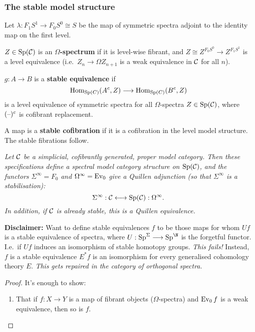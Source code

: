 \begin{MichaelStableModelCats}
\subsubsection*{The stable model structure}
\begin{itemise}
\item Let $\lambda:F_1S^1\to F_0S^0\cong S$ be the map of symmetric spectra adjoint to the identity map on the first level.
\item $Z\in\operatorname{Sp}(\mathcal{C})$ is an \textbf{$\Omega$-spectrum} if it is level-wise fibrant, and $Z\cong Z^{F_0S^0}\to Z^{F_1S^1}$ is a level equivalence (i.e.\ $Z_n\to\Omega Z_{n+1}$ is a weak equivalence in $\mathcal{C}$ for all $n$).
\item $g:A\to B$ is a \textbf{stable equivalence} if
\[\operatorname{Hom}_{\operatorname{Sp}(C)}(A^c,Z)\longrightarrow\operatorname{Hom}_{\operatorname{Sp}(C)}(B^c,Z)\]
is a level equivalence of symmetric spectra for all $\Omega$-spectra $Z\in\operatorname{Sp}(\mathcal{C})$, where $(\textup{--})^c$ is cofibrant replacement.
\item A map is a \textbf{stable cofibration} if it is a cofibration in the level model structure. The stable fibrations follow.
\item \textit{Let $\mathcal{C}$ be a simplicial, cofibrantly generated, proper model category.
Then these specifications define a spectral model category structure on $\operatorname{Sp}(\mathcal{C})$, and the functors $\Sigma^{\infty}=F_0$ and $\Omega^\infty=\operatorname{Ev}_0$ give a Quillen adjunction (so that $\Sigma^\infty$ is a stabilisation):
\[\Sigma^\infty:\mathcal{C}\longleftrightarrow\operatorname{Sp}(\mathcal{C}):\Omega^\infty.\]
In addition, if $\mathcal{C}$ is already stable, this is a Quillen equivalence.}
\item \textbf{Disclaimer:} Want to define stable equivalences $f$ to be those maps for whom $Uf$ is a stable equivalence of spectra, where $U:\Sp^\Sigma\to\Sp^\N$ is the forgetful functor. I.e.\ if $Uf$ induces an isomorphism of stable homotopy groups. \emph{This fails!} Instead, $f$ is a stable equivalence \Iff $E^*f$ is an isomorphism for every generalised cohomology theory $E$. \textit{This gets repaired in the category of orthogonal spectra.}
\end{itemise}
\begin{proof}
It's enough to show:
\begin{enumerate}
\item That if $f:X\to Y$ is a map of fibrant objects ($\Omega$-spectra) and $\operatorname{Ev}_0f$ is a weak equivalence, then so is $f$.
\end{enumerate}
\end{proof}
\end{MichaelStableModelCats}
